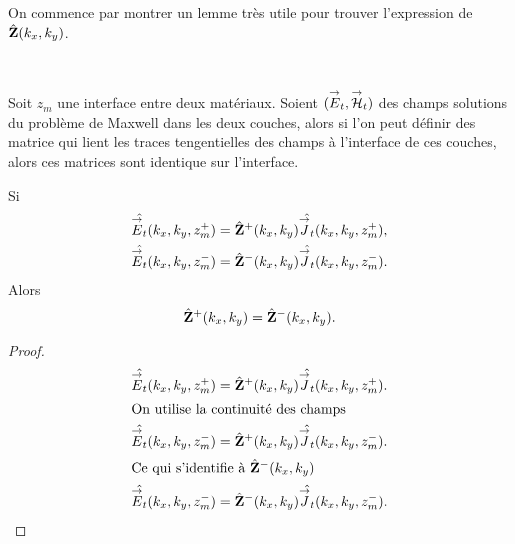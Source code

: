         On commence par montrer un lemme très utile pour trouver l'expression de \(\hat {\mathbf{Z}}(k_x,k_y)\).
        \begin{lemme}~{}

          \label{lem:plan:continuite_impedance}
          Soit \(z_m\) une interface entre deux matériaux.
          Soient \(({{\overset{\rightarrow}{E}}_t},{{\overset{\rightarrow}{\mathcal{H}}}}_t)\) des champs solutions du problème de Maxwell dans les deux couches, alors si l'on peut définir des matrice qui lient les traces tengentielles des champs à l'interface de ces couches, alors ces matrices sont identique sur l'interface.

          Si
          \begin{align*}
            \hat{{\overset{\rightarrow}{E}}_t}(k_x,k_y,z_m^+) &= \hat{\mathbf{Z}}^+(k_x,k_y) \hat{{\overset{\rightarrow}{J}}_t}(k_x,k_y,z_m^+),
            \\
            \hat{{\overset{\rightarrow}{E}}_t}(k_x,k_y,z_m^-) &= \hat{\mathbf{Z}}^-(k_x,k_y) \hat{{\overset{\rightarrow}{J}}_t}(k_x,k_y,z_m^-).
          \end{align*}
          Alors
          \begin{equation*}
          \hat {\mathbf{Z}}^+(k_x,k_y) = \hat {\mathbf{Z}}^-(k_x,k_y).
          \end{equation*}
        \end{lemme}
        \begin{proof}
          \begin{align*}
            \hat{{\overset{\rightarrow}{E}}_t}(k_x,k_y,z_m^+) &= \hat{\mathbf{Z}}^+(k_x,k_y) \hat{{\overset{\rightarrow}{J}}_t}(k_x,k_y,z_m^+).
            \\
            \intertext{On utilise la continuité des champs}
            \hat{{\overset{\rightarrow}{E}}_t}(k_x,k_y,z_m^-) &= \hat{\mathbf{Z}}^+(k_x,k_y) \hat{{\overset{\rightarrow}{J}}_t}(k_x,k_y,z_m^-).
            \\
            \intertext{Ce qui s'identifie à \(\hat{\mathbf{Z}}^-(k_x,k_y)\)}
            \hat{{\overset{\rightarrow}{E}}_t}(k_x,k_y,z_m^-) &= \hat{\mathbf{Z}}^-(k_x,k_y) \hat{{\overset{\rightarrow}{J}}_t}(k_x,k_y,z_m^-).
          \end{align*}
        \end{proof}

